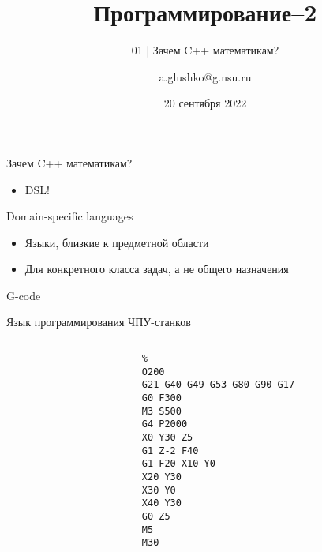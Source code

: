\documentclass[aspectratio=169,14pt]{beamer}
\title{Программирование--2}
\subtitle{01 | Зачем C++ математикам?}
\author{a.glushko@g.nsu.ru}
\date{20 сентября 2022}
\begin{document}
    \begin{frame}[fragile]
        \titlepage
    \end{frame}

    \begin{frame}{Зачем C++ математикам?}
        \Large
        \begin{itemize}
            \item DSL!
        \end{itemize}
    \end{frame}

    \begin{frame}[fragile]{Domain-specific languages}
        \begin{itemize}
            \item Языки, близкие к предметной области
            \item Для конкретного класса задач, а не общего назначения
        \end{itemize}
    \end{frame}

    \begin{frame}[fragile]{G-code}
        \begin{block}{Язык программирования ЧПУ-станков}
            \begin{columns}
                \begin{column}{0.4\textwidth}
                    \pause
                    \begin{verbatim}
                        %
                        O200
                        G21 G40 G49 G53 G80 G90 G17
                        G0 F300
                        M3 S500
                        G4 P2000
                        X0 Y30 Z5
                        G1 Z-2 F40
                        G1 F20 X10 Y0
                        X20 Y30
                        X30 Y0
                        X40 Y30
                        G0 Z5
                        M5
                        M30
                    \end{verbatim}
                \end{column}
                \begin{column}{0.6\textwidth}
                    \pause
                    \begin{center}
                        
                    \end{center}
                \end{column}
            \end{columns}
        \end{block}
    \end{frame}
\end{document}
